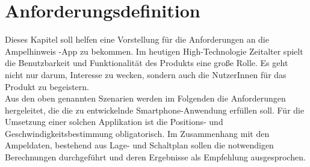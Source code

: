 \chapter{\label{chap:anforderungen}Anforderungsdefinition}
Dieses Kapitel soll helfen eine Vorstellung für die Anforderungen an die Ampelhinweis -App zu bekommen. Im heutigen High-Technologie Zeitalter spielt die Benutzbarkeit und Funktionalität des Produkts eine große Rolle. Es geht nicht nur darum, Interesse zu wecken, sondern auch die NutzerInnen für das Produkt zu begeistern. \\
Aus den oben genannten Szenarien werden im Folgenden die Anforderungen hergeleitet, die die zu entwickelnde \gls{Smartphone}-Anwendung erfüllen soll. Für die Umsetzung einer solchen Applikation ist die Positions- und Geschwindigkeitsbestimmung obligatorisch. Im Zusammenhang mit den Ampeldaten, bestehend aus Lage- und Schaltplan sollen die notwendigen Berechnungen durchgeführt und deren Ergebnisse als Empfehlung ausgesprochen.
